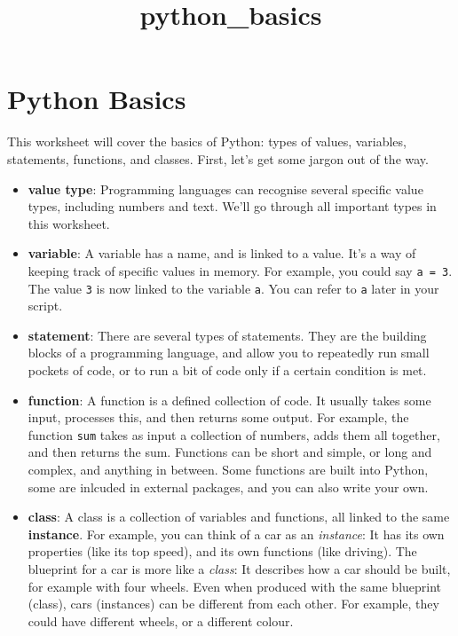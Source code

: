 \documentclass[11pt]{article}
\title{python\_basics}
\providecommand{\tightlist}{%
      \setlength{\itemsep}{0pt}\setlength{\parskip}{0pt}}
\begin{document}
    
    
    \maketitle
    
    

    
    \section{Python Basics}\label{python-basics}

This worksheet will cover the basics of Python: types of values,
variables, statements, functions, and classes. First, let's get some
jargon out of the way.

\begin{itemize}
\tightlist
\item
  \textbf{value type}: Programming languages can recognise several
  specific value types, including numbers and text. We'll go through all
  important types in this worksheet.
\item
  \textbf{variable}: A variable has a name, and is linked to a value.
  It's a way of keeping track of specific values in memory. For example,
  you could say \texttt{a\ =\ 3}. The value \texttt{3} is now linked to
  the variable \texttt{a}. You can refer to \texttt{a} later in your
  script.
\item
  \textbf{statement}: There are several types of statements. They are
  the building blocks of a programming language, and allow you to
  repeatedly run small pockets of code, or to run a bit of code only if
  a certain condition is met.
\item
  \textbf{function}: A function is a defined collection of code. It
  usually takes some input, processes this, and then returns some
  output. For example, the function \texttt{sum} takes as input a
  collection of numbers, adds them all together, and then returns the
  sum. Functions can be short and simple, or long and complex, and
  anything in between. Some functions are built into Python, some are
  inlcuded in external packages, and you can also write your own.
\item
  \textbf{class}: A class is a collection of variables and functions,
  all linked to the same \textbf{instance}. For example, you can think
  of a car as an \emph{instance}: It has its own properties (like its
  top speed), and its own functions (like driving). The blueprint for a
  car is more like a \emph{class}: It describes how a car should be
  built, for example with four wheels. Even when produced with the same
  blueprint (class), cars (instances) can be different from each other.
  For example, they could have different wheels, or a different colour.
\end{itemize}
\end{document}
